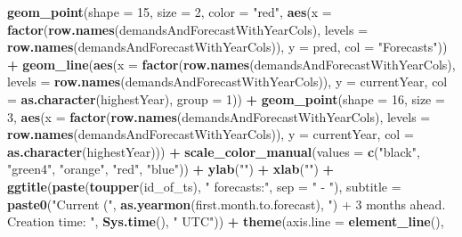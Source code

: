 \documentclass[
]{article}
\newenvironment{Shaded}{\begin{snugshade}}{\end{snugshade}}
\newcommand{\AttributeTok}[1]{\textcolor[rgb]{0.13,0.29,0.53}{#1}}
\newcommand{\DecValTok}[1]{\textcolor[rgb]{0.00,0.00,0.81}{#1}}
\newcommand{\FunctionTok}[1]{\textcolor[rgb]{0.13,0.29,0.53}{\textbf{#1}}}
\newcommand{\NormalTok}[1]{#1}
\newcommand{\SpecialCharTok}[1]{\textcolor[rgb]{0.81,0.36,0.00}{\textbf{#1}}}
\newcommand{\StringTok}[1]{\textcolor[rgb]{0.31,0.60,0.02}{#1}}
\begin{document}
\begin{Shaded}
\begin{Highlighting}[]
    \FunctionTok{geom\_point}\NormalTok{(}\AttributeTok{shape =} \DecValTok{15}\NormalTok{, }\AttributeTok{size =} \DecValTok{2}\NormalTok{, }\AttributeTok{color =} \StringTok{"red"}\NormalTok{, }\FunctionTok{aes}\NormalTok{(}\AttributeTok{x =} \FunctionTok{factor}\NormalTok{(}\FunctionTok{row.names}\NormalTok{(demandsAndForecastWithYearCols), }\AttributeTok{levels =} \FunctionTok{row.names}\NormalTok{(demandsAndForecastWithYearCols)), }\AttributeTok{y =}\NormalTok{ pred, }\AttributeTok{col =} \StringTok{"Forecasts"}\NormalTok{)) }\SpecialCharTok{+}
    \FunctionTok{geom\_line}\NormalTok{(}\FunctionTok{aes}\NormalTok{(}\AttributeTok{x =} \FunctionTok{factor}\NormalTok{(}\FunctionTok{row.names}\NormalTok{(demandsAndForecastWithYearCols), }\AttributeTok{levels =} \FunctionTok{row.names}\NormalTok{(demandsAndForecastWithYearCols)), }\AttributeTok{y =}\NormalTok{ currentYear, }\AttributeTok{col =} \FunctionTok{as.character}\NormalTok{(highestYear), }\AttributeTok{group =} \DecValTok{1}\NormalTok{)) }\SpecialCharTok{+}
    \FunctionTok{geom\_point}\NormalTok{(}\AttributeTok{shape =} \DecValTok{16}\NormalTok{, }\AttributeTok{size =} \DecValTok{3}\NormalTok{, }\FunctionTok{aes}\NormalTok{(}\AttributeTok{x =} \FunctionTok{factor}\NormalTok{(}\FunctionTok{row.names}\NormalTok{(demandsAndForecastWithYearCols), }\AttributeTok{levels =} \FunctionTok{row.names}\NormalTok{(demandsAndForecastWithYearCols)), }\AttributeTok{y =}\NormalTok{ currentYear, }\AttributeTok{col =} \FunctionTok{as.character}\NormalTok{(highestYear))) }\SpecialCharTok{+}
    \FunctionTok{scale\_color\_manual}\NormalTok{(}\AttributeTok{values =} \FunctionTok{c}\NormalTok{(}\StringTok{"black"}\NormalTok{, }\StringTok{"green4"}\NormalTok{, }\StringTok{"orange"}\NormalTok{, }\StringTok{"red"}\NormalTok{, }\StringTok{"blue"}\NormalTok{)) }\SpecialCharTok{+}
    \FunctionTok{ylab}\NormalTok{(}\StringTok{""}\NormalTok{) }\SpecialCharTok{+}
    \FunctionTok{xlab}\NormalTok{(}\StringTok{""}\NormalTok{) }\SpecialCharTok{+}
    \FunctionTok{ggtitle}\NormalTok{(}\FunctionTok{paste}\NormalTok{(}\FunctionTok{toupper}\NormalTok{(id\_of\_ts), }\StringTok{" forecasts:"}\NormalTok{, }\AttributeTok{sep =} \StringTok{" {-} "}\NormalTok{), }\AttributeTok{subtitle =} \FunctionTok{paste0}\NormalTok{(}\StringTok{"Current ("}\NormalTok{, }\FunctionTok{as.yearmon}\NormalTok{(first.month.to.forecast), }\StringTok{") + 3 months ahead. Creation time: "}\NormalTok{,  }\FunctionTok{Sys.time}\NormalTok{(), }\StringTok{" UTC"}\NormalTok{)) }\SpecialCharTok{+}
    \FunctionTok{theme}\NormalTok{(}\AttributeTok{axis.line =} \FunctionTok{element\_line}\NormalTok{(),}

\end{Highlighting}
\end{Shaded}
\end{document}
